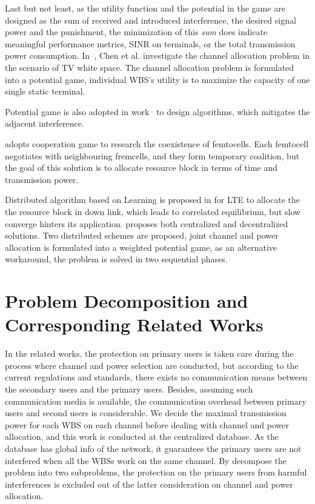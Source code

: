Last but not least, as the utility function and the potential in the game are designed as the sum of received and introduced interference, the desired signal power and the punishment, the minimization of this \textit{sum} does indicate meaningful  performance metrics, \ie SINR on terminals, or the total transmission power consumption.
In~\cite{spectrum_sharing_tvspace_2012}, Chen et al. investigate the channel allocation problem in the scenario of TV white space.
The channel allocation problem is formulated into a potential game, individual WBS's utility is to maximize the capacity of one single static terminal.

Potential game is also adopted in work~\cite{tvws_paper_networking2015} to design algorithms, which mitigates the adjacent interference.




\cite{powerChannelAllocation_2015_shapley} adopts cooperation game to research the coexistence of femtocells.
Each femtocell negotiates with neighbouring fremcells, and they form temporary coalition, but the goal of this solution is to allocate resource block in terms of time and transmission power.

%
Distributed algorithm based on Learning is proposed in \cite{cogCE_huang} for LTE to allocate the the resource block in down link, which leads to correlated equilibrium, but slow converge hinters its application.
%
\cite{joint_power_channel_linkpair_08ICT} proposes both centralized and decentralized solutions.
Two distributed schemes are proposed, joint channel and power allocation is formulated into a weighted potential game, as an alternative workaround, the problem is solved in two sequential phases.






\section{Problem Decomposition and Corresponding Related Works}
In the related works, the protection on primary users is taken care during the process where channel and power selection are conducted, but according to the current regulations and standards, there exists no communication means between the secondary users and the primary users.
Besides, assuming such communication media is available, the communication overhead between primary users and second users is considerable.
We decide the maximal transmission power for each WBS on each channel before dealing with channel and power allocation, and this work is conducted at the centralized database.
As the database has global info of the network, it guarantees the primary users are not interfered when all the WBSs work on the same channel.
By decompose the problem into two subproblems, the protection on the primary users from harmful interferences is excluded out of the latter consideration on channel and power allocation.


